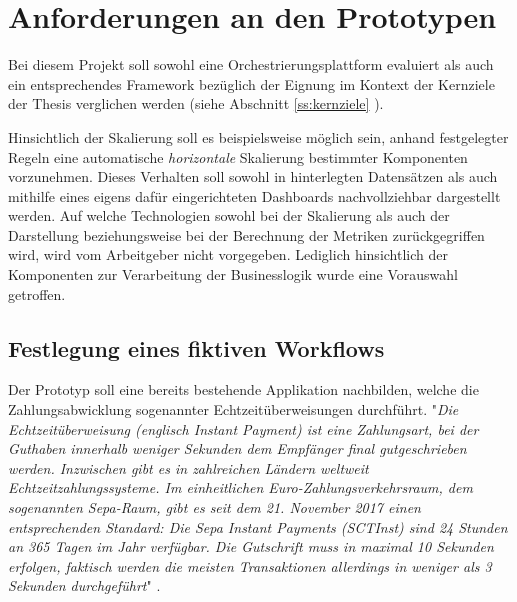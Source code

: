 \section{Anforderungen an den Prototypen}
\label{sec:anforderungProto}

Bei diesem Projekt soll sowohl eine Orchestrierungsplattform evaluiert als auch ein entsprechendes Framework  bezüglich der Eignung im Kontext der Kernziele der Thesis verglichen werden (siehe Abschnitt \ref{ss:kernziele} ). 

Hinsichtlich der Skalierung soll es beispielsweise möglich sein, anhand festgelegter Regeln eine automatische \emph{horizontale} Skalierung bestimmter Komponenten vorzunehmen. Dieses Verhalten soll sowohl in hinterlegten Datensätzen als auch mithilfe eines eigens dafür eingerichteten Dashboards nachvollziehbar dargestellt werden. Auf welche Technologien sowohl bei der Skalierung als auch der Darstellung beziehungsweise bei der Berechnung der Metriken zurückgegriffen wird, wird vom Arbeitgeber nicht vorgegeben. Lediglich hinsichtlich der Komponenten zur Verarbeitung der Businesslogik wurde eine Vorauswahl getroffen. 



\subsection{Festlegung eines fiktiven Workflows}
\label{ss:fiktiverWorkflow}

Der Prototyp soll eine bereits bestehende Applikation nachbilden, welche die Zahlungsabwicklung sogenannter Echtzeitüberweisungen durchführt. "\emph{Die Echtzeitüberweisung (englisch Instant Payment) ist eine Zahlungsart, bei der Guthaben innerhalb weniger Sekunden dem Empfänger final gutgeschrieben werden. Inzwischen gibt es in zahlreichen Ländern weltweit Echtzeitzahlungssysteme. Im einheitlichen Euro-Zahlungsverkehrsraum, dem sogenannten Sepa-Raum, gibt es seit dem 21. November 2017 einen entsprechenden Standard: Die Sepa Instant Payments (SCTInst) sind 24 Stunden an 365 Tagen im Jahr verfügbar. Die Gutschrift muss in maximal 10 Sekunden erfolgen, faktisch werden die meisten Transaktionen allerdings in weniger als 3 Sekunden durchgeführt}" \cite{instpay-def}.

